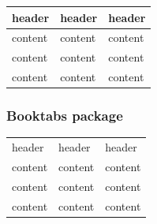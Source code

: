 \begin{filecontents*}{\democodefile}
\begin{table}[H]
\small\sffamily\renewcommand{\arraystretch}{1.4}
\begin{tabular}{lll}
\toprule
  header  & header  & header \\
\midrule
  content & content & content \\
  content & content & content \\
  content & content & content \\
\bottomrule
\end{tabular}
\end{table}
\end{filecontents*}

\subsubsection{Booktabs package}
\label{sec:tableStyleBooktabs1}

%

\begin{filecontents*}{\democodefile}
\small\sffamily\renewcommand{\arraystretch}{1.4}
\end{filecontents*}

%

\begin{filecontents*}{\democodefile}
\begin{table}[H]
\small\sffamily\renewcommand{\arraystretch}{1.4}
\begin{tabular}{lll}
\toprule
  header  & header  & header \\ \cmidrule(r){1-1}
                                \cmidrule(lr){2-2}
                                \cmidrule(l){3-3}
  content & content & content \\
  content & content & content \\
  content & content & content \\
\bottomrule
\end{tabular}
\end{table}
\end{filecontents*}

